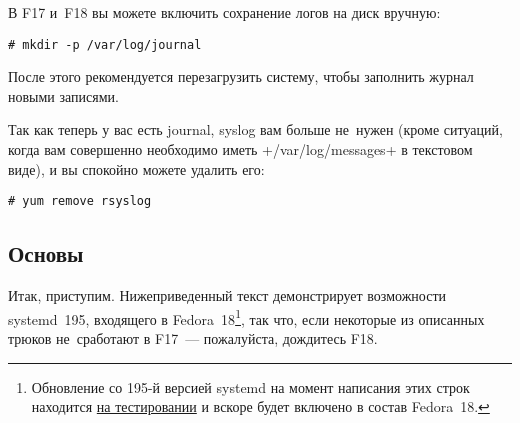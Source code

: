 \documentclass[10pt,oneside,a4paper]{article}
\begin{document}
В F17 и~F18 вы можете включить сохранение логов на диск вручную:
\begin{Verbatim}
# mkdir -p /var/log/journal
\end{Verbatim}
После этого рекомендуется перезагрузить систему, чтобы заполнить журнал новыми
записями.

Так как теперь у вас есть journal, syslog вам больше не~нужен (кроме ситуаций,
когда вам совершенно необходимо иметь +/var/log/messages+ в текстовом виде), и
вы спокойно можете удалить его:
\begin{Verbatim}
# yum remove rsyslog
\end{Verbatim}

\subsection{Основы}

Итак, приступим. Нижеприведенный текст демонстрирует возможности systemd~195,
входящего в Fedora~18\footnote{Обновление со 195-й версией systemd на момент
написания этих строк находится
\href{https://admin.fedoraproject.org/updates/FEDORA-2012-16709/systemd-195-1.fc18}{на
тестировании} и вскоре будет включено в состав Fedora~18.}, так что, если
некоторые из описанных трюков не~сработают в F17~--- пожалуйста, дождитесь F18.
\end{document}
